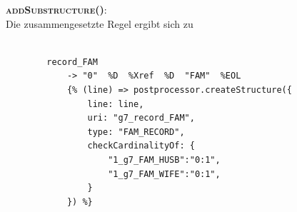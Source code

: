 \vspace{1em}
\textsc{\textbf{addSubstructure()}:} \vspace{0.5em} \\
Die zusammengesetzte Regel ergibt sich zu 
\\ \\
\begin{minipage}{1.0\textwidth} \small
	\begin{lstlisting}
		record_FAM
			-> "0"  %D  %Xref  %D  "FAM"  %EOL
			{% (line) => postprocessor.createStructure({
				line: line,
				uri: "g7_record_FAM", 
				type: "FAM_RECORD", 
				checkCardinalityOf: {
					"1_g7_FAM_HUSB":"0:1", 
					"1_g7_FAM_WIFE":"0:1",
				}
			}) %}
	\end{lstlisting}
	\label{lst: nearley regel family record mit postprozessor und substructs}
\end{minipage}
\\ \\

